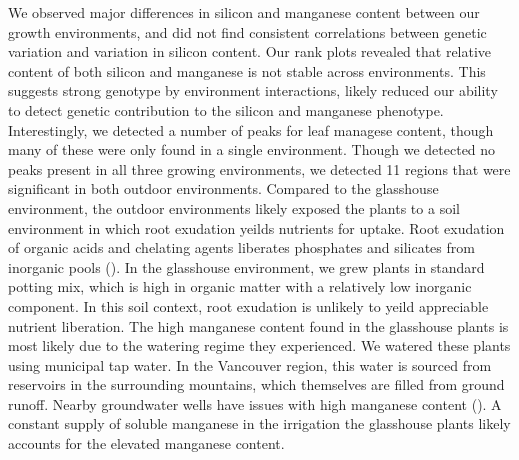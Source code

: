 \documentclass[12pt, letterpaper, ]{report}
\begin{document}
We observed major differences in silicon and manganese content between our growth environments, and did not find consistent correlations between genetic variation and variation in silicon content. Our rank plots revealed that relative content of both silicon and manganese is not stable across environments. This suggests strong genotype by environment interactions, likely reduced our ability to detect genetic contribution to the silicon and manganese phenotype. Interestingly, we detected a number of peaks for leaf managese content, though many of these were only found in a single environment. Though we detected no peaks present in all three growing environments, we detected 11 regions that were significant in both outdoor environments. Compared to the glasshouse environment, the outdoor environments likely exposed the plants to a soil environment in which root exudation yeilds nutrients for uptake. Root exudation of organic acids and chelating agents liberates phosphates and silicates from inorganic pools (\cite{de_tombeur_silicon_2021-1,lambers_plant_2008}). In the glasshouse environment, we grew plants in standard potting mix, which is high in organic matter with a relatively low inorganic component. In this soil context, root exudation is unlikely to yeild appreciable nutrient liberation. The high manganese content found in the glasshouse plants is most likely due to the watering regime they experienced. We watered these plants using municipal tap water. In the Vancouver region, this water is sourced from reservoirs in the surrounding mountains, which themselves are filled from ground runoff. Nearby groundwater wells have issues with high manganese content (\cite{hu_drinking_2020}). A constant supply of soluble manganese in the irrigation the glasshouse plants likely accounts for the elevated manganese content. 
\end{document}
